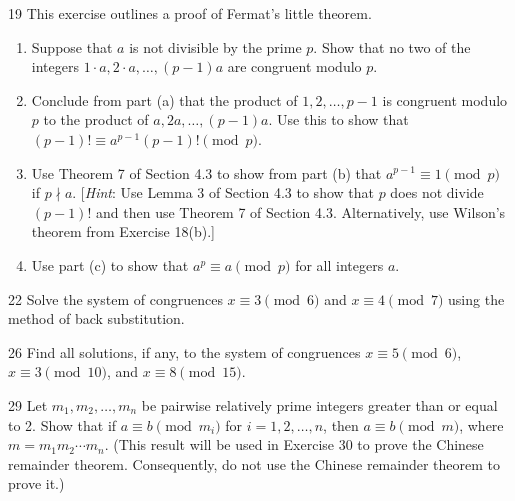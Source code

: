 \documentclass[11pt]{article}
\begin{document}
\begin{exercise}{19}
    This exercise outlines a proof of Fermat's little theorem.
    \begin{enumerate}[label=(\alph*)]
        \item Suppose that $a$ is not divisible by the prime $p$.
        Show that no two of the integers
        $1 \cdot a, 2 \cdot a, \dots, (p-1)a$ are congruent modulo
        $p$.
        \item Conclude from part (a) that the product of
        $1, 2, \dots, p-1$ is congruent modulo $p$ to the product of
        $a, 2a, \dots, (p-1)a$. Use this to show that
        $(p-1)! \equiv a^{p-1}(p-1)! \pmod{p}$.
        \item Use Theorem 7 of Section 4.3 to show from part (b)
        that $a^{p-1} \equiv 1 \pmod{p}$ if $p \nmid a$.
        [\emph{Hint}: Use Lemma 3 of Section 4.3 to show that $p$
        does not divide $(p-1)!$ and then use Theorem 7 of Section
        4.3. Alternatively, use Wilson's theorem from Exercise
        18(b).]
        \item Use part (c) to show that $a^p \equiv a \pmod{p}$ for
        all integers $a$.
    \end{enumerate}
\end{exercise}

\begin{exercise}{22}
    Solve the system of congruences $x \equiv 3 \pmod{6}$ and
    $x \equiv 4 \pmod{7}$ using the method of back substitution.
\end{exercise}

\begin{exercise}{26}
    Find all solutions, if any, to the system of congruences
    $x \equiv 5 \pmod{6}$, $x \equiv 3 \pmod{10}$, and
    $x \equiv 8 \pmod{15}$.
\end{exercise}

\begin{exercise}{29}
    Let $m_1, m_2, \dots, m_n$ be pairwise relatively prime integers
    greater than or equal to 2. Show that if $a \equiv b
    \pmod{m_i}$ for $i = 1, 2, \dots, n$, then $a \equiv b
    \pmod{m}$, where $m = m_1 m_2 \cdots m_n$. (This result will be
    used in Exercise 30 to prove the Chinese remainder theorem.
    Consequently, do not use the Chinese remainder theorem to prove
    it.)
\end{exercise}
\end{document}
